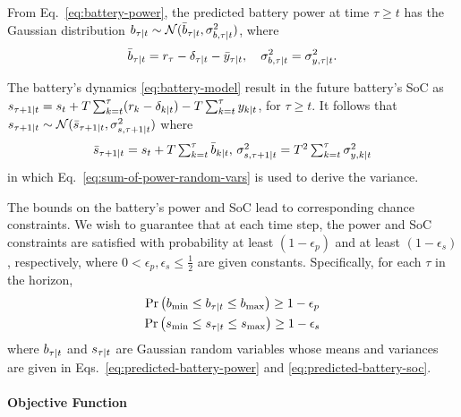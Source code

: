 From Eq.~\eqref{eq:battery-power}, the predicted battery power at time \(\tau \geq t\) has the Gaussian distribution \(\predict{\tau}{\Pbatt} \sim 
\GaussianDistSmall{\predict{\tau}{\bar{\Pbatt}}}{\predict{b,\tau}{\sigma^2}}\), where
\begin{equation}
\label{eq:predicted-battery-power}
\predict{\tau}{\bar{\Pbatt}} = r_\tau - \predict{\tau}{\delta} - \predict{\tau}{\bar{y}}, \quad
\predict{b,\tau}{\sigma^2} =  \predict{y,\tau}{\sigma^2} \text.
\end{equation}

The battery's dynamics \eqref{eq:battery-model} result in the future battery's SoC as
\(\predict{\tau+1}{s} = s_t + T \textstyle\sum_{k=t}^\tau (r_k - \predict{k}{\delta}) - T \textstyle\sum_{k=t}^\tau \predict{k}{y}\),
for \(\tau \geq t\).
It follows that \(\predict{\tau+1}{s} \sim \GaussianDistSmall{\predict{\tau+1}{\bar{s}}}{\predict{s,\tau+1}{\sigma^2}}\) where
\begin{equation}
\label{eq:predicted-battery-soc}
\predict{\tau+1}{\bar{s}} = s_t + T \textstyle\sum_{k=t}^\tau \predict{k}{\bar{\Pbatt}}, \,
\predict{s,\tau+1}{\sigma^2} = T^2 \textstyle\sum_{k=t}^\tau \predict{y,k}{\sigma^2} 
\end{equation}
in which Eq.~\eqref{eq:sum-of-power-random-vars} is used to derive the variance.

The bounds on the battery's power and SoC lead to corresponding chance constraints.
We wish to guarantee that at each time step, the power and SoC constraints are satisfied with probability at least \((1 - \epsilon_p)\) and  at least \((1 - \epsilon_s)\), respectively, where \(0 < \epsilon_p, \epsilon_s \leq \frac{1}{2}\) are given constants.
Specifically, for each \(\tau\) in the horizon,
\begin{subequations}\label{eq:chance-constraints}
\begin{gather}
\Pr\left( \Pbmin \leq \predict{\tau}{\Pbatt} \leq \Pbmax \right) \geq 1 - \epsilon_p \label{eq:chance-constraints:power} \\
\Pr\left( \SOCmin \leq \predict{\tau}{s} \leq \SOCmax \right) \geq 1 - \epsilon_s \label{eq:chance-constraints:soc}
\end{gather}
\end{subequations}
where \(\predict{\tau}{\Pbatt}\) and \(\predict{\tau}{s}\) are Gaussian random variables whose means and variances are given in Eqs.~\eqref{eq:predicted-battery-power} and \eqref{eq:predicted-battery-soc}.


\paragraph{Objective Function}



